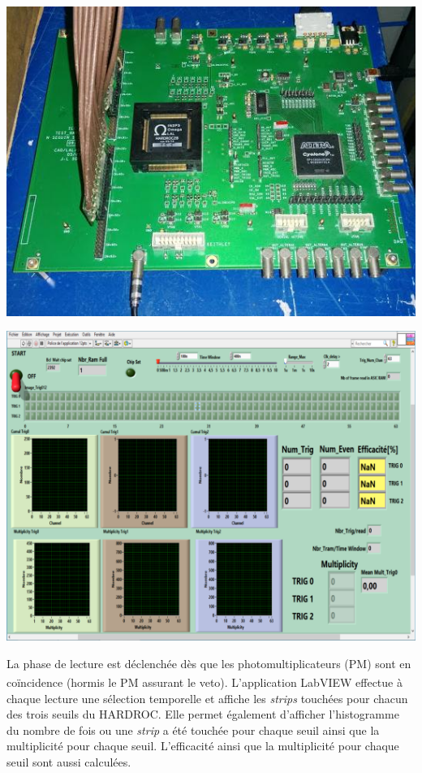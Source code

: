 \noindent
\begin{minipage}[t]{.48\textwidth}
	\noindent
	\centering
	\includegraphics[width=1\textwidth]{GLA/carte.jpg}
	\label{carte}
\end{minipage}%
\hfill
\begin{minipage}[t]{.48\textwidth}
	\noindent
	\centering
	\includegraphics[width=1\textwidth]{GLA/labview.png}
	\label{labview}
\end{minipage}

La phase de lecture est déclenchée dès que les photomultiplicateurs (PM) sont en coïncidence (hormis le PM assurant le veto). L'application LabVIEW\textsuperscript{\textregistered} effectue à chaque lecture une sélection temporelle et affiche les \textit{strips} touchées pour chacun des trois seuils du HARDROC. Elle permet également d'afficher l'histogramme du nombre de fois ou une \textit{strip} a été touchée pour chaque seuil ainsi que la multiplicité pour chaque seuil. L'efficacité ainsi que la multiplicité pour chaque seuil sont aussi calculées.


